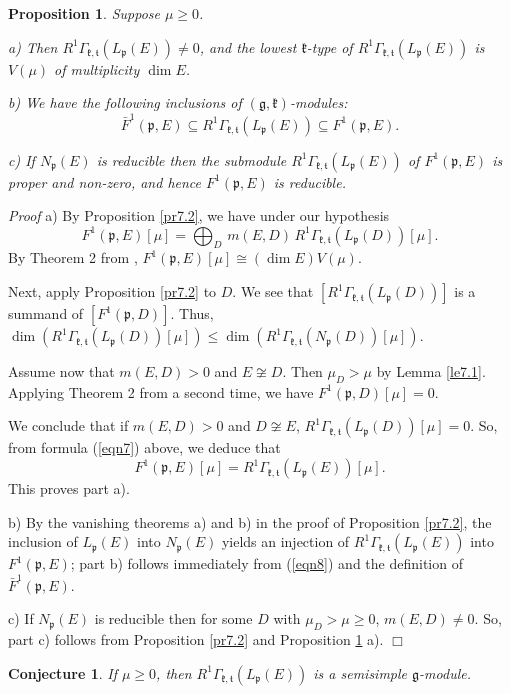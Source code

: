 \documentclass[11pt]{amsart}
\newcounter{theorem}
\newtheorem{prop}[theo]{Proposition}
\newtheorem{conjecture}[theo]{Conjecture}
\renewenvironment{proof}{ \emph{Proof}}{$\Box$}
\renewcommand{\tt}{\mathfrak{t}}
\newcommand{\kk}{\mathfrak{k}}
\newcommand{\pp}{\mathfrak{p}}
\renewcommand{\gg}{\mathfrak{g}}
\newcommand{\refle}[1]{Lemma \ref{#1}}
\newcommand{\refprop}[1]{Proposition \ref{#1}}
\newcommand{\refeq}[1]{(\ref{#1})}
\begin{document}
\begin{prop}\label{pr7.3}
Suppose $\mu\geq 0$.

a) Then $R^1\Gamma_{\kk,\tt}(L_\pp(E))\neq 0$, and the lowest $\kk$-type of $R^1\Gamma_{\kk,\tt}(L_\pp(E))$ is $V(\mu)$ of multiplicity $\dim E$.

b) We have the following inclusions of $(\gg,\kk)$-modules: $$\bar{F}^1(\pp,E)\subseteq R^1\Gamma_{\kk,\tt}(L_\pp(E))\subseteq F^1(\pp,E).$$

c) If $N_\pp(E)$ is reducible then the submodule $R^1\Gamma_{\kk,\tt}(L_\pp(E))$ of $F^1(\pp,E)$ is proper and non-zero, and hence $F^1(\pp,E)$ is reducible.
\end{prop}
\begin{proof}
a) By \refprop{pr7.2}, we have under our hypothesis
\begin{equation}\label{eqn7}
F^1(\pp,E)[\mu]=\bigoplus_D\,m(E,D)\, R^1\Gamma_{\kk,\tt}(L_\pp(D))[\mu].
\end{equation}
By Theorem 2 from \cite{PZ3}, $F^1(\pp,E)[\mu]\cong(\dim E)V(\mu)$. 

Next, apply \refprop{pr7.2} to $D$. We see that $[R^1\Gamma_{\kk,\tt}(L_\pp(D))]$ is a summand of $[F^1(\pp,D)]$. Thus, $\dim (R^1\Gamma_{\kk,\tt}(L_\pp(D))[\mu])\leq\dim (R^1\Gamma_{\kk,\tt}(N_\pp(D))[\mu])$.

Assume now that $m(E,D)>0$ and $E\not\cong D$. Then $\mu_D>\mu$ by \refle{le7.1}. Applying Theorem 2 from \cite{PZ3} a second time, we have $F^1(\pp,D)[\mu]=0$. 

We conclude that if $m(E,D)>0$ and $D\not\cong E$, $R^1\Gamma_{\kk,\tt}(L_\pp(D))[\mu]=0$. So, from formula \refeq{eqn7} above, we deduce that
\begin{equation}\label{eqn8}
F^1(\pp,E)[\mu]=R^1\Gamma_{\kk,\tt}(L_\pp(E))[\mu].
\end{equation}
This proves part a).

b) By the vanishing theorems a) and b) in the proof of \refprop{pr7.2}, the inclusion of $L_\pp(E)$ into $N_\pp(E)$ yields an injection of $R^1\Gamma_{\kk,\tt}(L_\pp(E))$ into $F^1(\pp,E)$; part b) follows immediately from \refeq{eqn8} and the definition of $\bar{F}^1(\pp,E)$.

c) If $N_\pp(E)$ is reducible then for some $D$ with $\mu_D>\mu\geq 0$, $m(E,D)\neq 0$. So, part c) follows from \refprop{pr7.2} and \refprop{pr7.3} a).
\end{proof}

\begin{conjecture}\label{conj7.4}
If $\mu\geq 0$, then $R^1\Gamma_{\kk,\tt}(L_\pp(E))$ is a semisimple $\gg$-module.
\end{conjecture}
\end{document}
